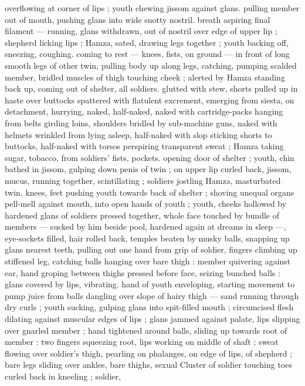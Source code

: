 overflowing at corner of lips ; youth chewing jissom against glans. 
pulling member out of mouth, pushing glans into wide snotty nostril. 
breath aspiring final filament --- running, glans withdrawn, out of 
nostril over edge of upper lip ; shepherd licking lips ; Hamza, sated, 
drawing legs together ; youth backing off, sneezing, coughing. 
coming to rest --- knees, fists, on ground --- in front of long smooth 
legs of other twin, pulling body up along legs, catching, pumping 
scalded member, bridled muscles of thigh touching cheek ; alerted 
by Hamza standing back up, coming out of shelter, all soldiers. 
glutted with stew, shorts pulled up in haste over buttocks spattered 
with flatulent excrement, emerging from siesta, on detachment, 
hurrying, naked, half-naked, naked with cartridge-packs hanging 
from belts girding loins, shoulders bridled by sub-machine guns, 
naked with helmets wrinkled from lying asleep, half-naked with slop 
sticking shorts to buttocks, half-naked with torsos perspiring 
transparent sweat ; Hamza taking sugar, tobacco, from soldiers' fists, 
pockets. opening door of shelter ; youth, chin bathed in jissom, 
gulping down penis of twin ; on upper lip curled back, jissom, mucus, 
running together, scintillating ; soldiers jostling Hamza, masturbated 
twin, knees, feet pushing youth towards back of shelter ; shoving 
unequal organs pell-mell against mouth, into open hands of youth ; 
youth, cheeks hollowed by hardened glans of soldiers pressed 
together, whole face touched by bundle of members --- sucked by 
him beside pool, hardened again at dreams in sleep ---, eye-sockets 
filled, hair rolled back, temples beaten by musky balls, snapping up 
glans nearest teeth, pulling out one hand from grip of soldier, fingers 
climbing up stiffened leg, catching balls hanging over bare thigh : 
member quivering against ear, hand groping between thighs pressed 
before face, seizing bunched balls : glans covered by lips, vibrating. 
hand of youth enveloping, starting movement to pump juice from 
balls dangling over slope of hairy thigh --- sand running through dry 
curls ; youth sucking, gulping glans into spit-filled mouth ; 
circumcised flesh dilating against muscular edges of lips ; glans 
jammed against palate, lips slipping over gnarled member ; hand 
tightened around balls, sliding up towards root of member : two 
fingers squeezing root, lips working on middle of shaft ; sweat 
flowing over soldier's thigh, pearling on phalanges, on edge of lips, 
of shepherd ; bare legs sliding over ankles, bare thighs, sexual 
Cluster of soldier touching toes curled back in kneeling ; soldier, 
